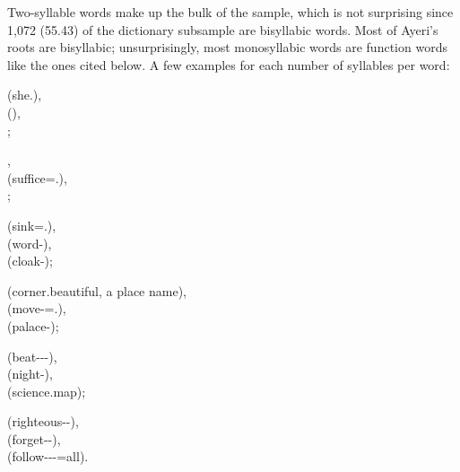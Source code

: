 Two-syllable words make up the bulk of the sample, which is not surprising since 
1,072 (55.43\pct) of the dictionary subsample are bisyllabic words. Most of 
Ayeri's roots are bisyllabic; unsurprisingly, most monosyllabic words are 
function words like the ones cited below. A few examples for each number of 
syllables per word:

\pex
	\a {} (she.\Aarg{}),\\
		 (\PatT),\\
		;
		
	\a {},\\
		 (suffice=\TsgI{}.\Aarg{}),\\
		;
		
	\a {} (sink=\TsgM{}.\Aarg{}),\\
		 (word-\Pl{}),\\
		 (cloak-\PargI{});
		
	\a {} (corner.beautiful, a place name),\\
		 (move-\Hab{}=\TplN{}.\Aarg{}),\\
		 (palace-\Gen{});
		
	\a {} (beat-\Ptcp{}-\Nmlz{}-\Parg{}),\\
		 (night-\Gen{}),\\
		 (science.map);
		
	\a {} (righteous-\Nmlz{}-\Gen{}),\\
		 (forget-\Hab{}-\TplM{}),\\
		 (follow-\Agtz-\Pl{}-\Aarg{}=all).
\xe

